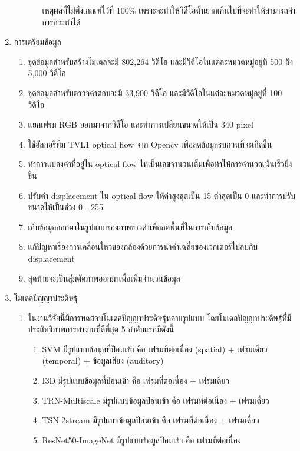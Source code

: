 \begin{enumerate}
\begin{enumerate}
\begin{enumerate}
		เหตุผลที่ไม่ตั้งเกณฑ์ไว้ที่ 100\% เพราะจะทำให้วิดีโอนั้นยากเกินไปที่จะทำให้สามารถจำการกระทำได้	
	\end{enumerate}
\end{enumerate}
	\item การเตรียมข้อมูล
		\begin{enumerate}
			\item ชุดข้อมูลสำหรับสร้างโมเดลจะมี 802,264 วิดีโอ และมีวิดีโอในแต่ละหมวดหมู่อยู่ที่ 500 ถึง 5,000 วิดีโอ
			\item ชุดข้อมูลสำหรับตรวจคำตอบจะมี 33,900 วิดีโอ และมีวิดีโอในแต่ละหมวดหมู่อยู่ที่ 100 วิดีโอ
			\item แยกเฟรม RGB ออกมาจากวิดีโอ และทำการเปลี่ยนขนาดให้เป็น 340  pixel
			\item ใช้อัลกอริทึม TVL1 optical flow จาก Opencv เพื่อลดข้อมูลรบกวนที่จะเกิดขึ้น
			\item ทำการแปลงค่าที่อยู่ใน optical flow ให้เป็นเลขจำนวนเต็มเพื่อทำให้การคำนวณนั้นเร็วยิ่งขึ้น
			\item ปรับค่า displacement ใน optical flow ให้ค่าสูงสุดเป็น 15 ต่ำสุดเป็น 0 และทำการปรับขนาดให้เป็นช่วง 0 - 255
			\item เก็บข้อมูลออกมาในรูปแบบของภาพขาวดำเพื่อลดพื้นที่ในการเก็บข้อมูล
			\item แก้ปัญหาเรื่องการเคลื่อนไหวของกล้องด้วยการนำค่าเฉลี่ยของเวกเตอร์ไปลบกับ displacement
			\item สุดท้ายจะเป็นสุ่มตัดภาพออกมาเพื่อเพิ่มจำนวนข้อมูล
		\end{enumerate}
	\item {โมเดลปัญญาประดิษฐ์}
	\begin{enumerate}
		\item ในงานวิจัยนี้มีการทดสอบโมเดลปัญญาประดิษฐ์หลายรูปแบบ โดยโมเดลปัญญาประดิษฐ์ที่มีประสิทธิภาพการทำงานที่ดีที่สุด 5 ลำดับแรกมีดังนี้
			\begin{enumerate}
				\item SVM มีรูปแบบข้อมูลที่ป้อนเข้า คือ เฟรมที่ต่อเนื่อง (spatial) + เฟรมเดี่ยว (temporal) + ข้อมูลเสียง (auditory) 	
				\item I3D มีรูปแบบข้อมูลที่ป้อนเข้า คือ เฟรมที่ต่อเนื่อง + เฟรมเดี่ยว
				\item TRN-Multiscale มีรูปแบบข้อมูลป้อนเข้า คือ เฟรมที่ต่อเนื่อง + เฟรมเดี่ยว
				\item TSN-2stream มีรูปแบบข้อมูลป้อนเข้า คือ เฟรมที่ต่อเนื่อง + เฟรมเดี่ยว
				\item ResNet50-ImageNet	มีรูปแบบข้อมูลป้อนเข้า คือ เฟรมที่ต่อเนื่อง
			\end{enumerate}

\end{enumerate}
\end{enumerate}
